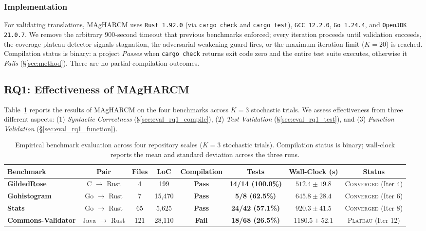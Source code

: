 \subsubsection{Implementation}
\label{sec:eval_impl}

For validating translations, MAgHARCM uses
\texttt{Rust 1.92.0} (via \texttt{cargo check} and \texttt{cargo test}),
\texttt{GCC 12.2.0}, \texttt{Go 1.24.4}, and \texttt{OpenJDK 21.0.7}.
We remove the arbitrary $900$-second timeout that previous benchmarks
enforced; every iteration proceeds until validation succeeds, the
coverage plateau detector signals stagnation, the adversarial
weakening guard fires, or the maximum iteration limit ($K{=}20$) is
reached. Compilation status is binary: a project \emph{Passes} when
\texttt{cargo check} returns exit code zero and the entire test
suite executes, otherwise it \emph{Fails}
(§\ref{sec:method}). There are no partial-compilation
outcomes.

\subsection{RQ1: Effectiveness of MAgHARCM}
\label{sec:eval_rq1}

Table~\ref{tab:k_results} reports the results of MAgHARCM on the four
benchmarks across $K{=}3$ stochastic trials. We assess effectiveness
from three different aspects: (1) \emph{Syntactic Correctness}
(§\ref{sec:eval_rq1_compile}), (2) \emph{Test Validation}
(§\ref{sec:eval_rq1_test}), and (3) \emph{Function Validation}
(§\ref{sec:eval_rq1_function}).

\begin{table}[!t]
\centering
\small
\begin{tabular}{lccccccc}
\toprule
\textbf{Benchmark} & \textbf{Pair} & \textbf{Files} & \textbf{LoC} & \textbf{Compilation} & \textbf{Tests} & \textbf{Wall-Clock (s)} & \textbf{Status} \\
\midrule
\textbf{GildedRose} & C $\to$ Rust & 4 & 199 & \textbf{Pass} & \textbf{14/14 (100.0\%)} & $512.4 \pm 19.8$ & \textsc{Converged} (Iter 4) \\
\textbf{Gohistogram} & Go $\to$ Rust & 7 & 15{,}470 & \textbf{Pass} & \textbf{5/8 (62.5\%)} & $645.8 \pm 28.4$ & \textsc{Converged} (Iter 6) \\
\textbf{Stats} & Go $\to$ Rust & 65 & 5{,}625 & \textbf{Pass} & \textbf{24/42 (57.1\%)} & $920.3 \pm 41.5$ & \textsc{Converged} (Iter 8) \\
\textbf{Commons-Validator} & Java $\to$ Rust & 121 & 28{,}110 & \textbf{Fail} & \textbf{18/68 (26.5\%)} & $1180.5 \pm 52.1$ & \textsc{Plateau} (Iter 12) \\
\bottomrule
\end{tabular}
\vspace{0.3em}
\caption{Empirical benchmark evaluation across four repository scales
($K{=}3$ stochastic trials). Compilation status is binary; wall-clock
reports the mean and standard deviation across the three runs.}
\label{tab:k_results}
\end{table}

